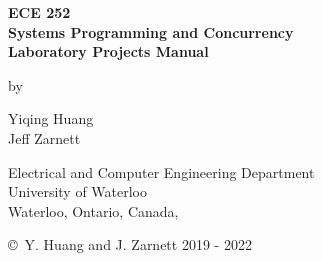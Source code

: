 \pagestyle{empty}

\begin{titlepage}
        \begin{center}
        \vspace*{1.0cm}

        \Huge
        {\bf ECE 252 \\
             Systems Programming and Concurrency \\} 
        \LARGE
        {\bf Laboratory Projects Manual}

        \vspace*{3.0cm}

        \normalsize
        by \\

        \vspace*{1.0cm}

        \Large
        Yiqing Huang \\
        Jeff Zarnett

        \vspace*{3.0cm}

        \normalsize
        Electrical and Computer Engineering Department \\
        University of Waterloo \\ 

        \vspace*{2.0cm}
\makeatletter
        Waterloo, Ontario, Canada, \@date \\
\makeatother
        
      
        
        \vspace*{1.0cm}

        \copyright\ Y. Huang and J. Zarnett 2019 - 2022 \\
        \end{center}
\end{titlepage}

\pagestyle{plain}
\setcounter{page}{2}

\cleardoublepage %

